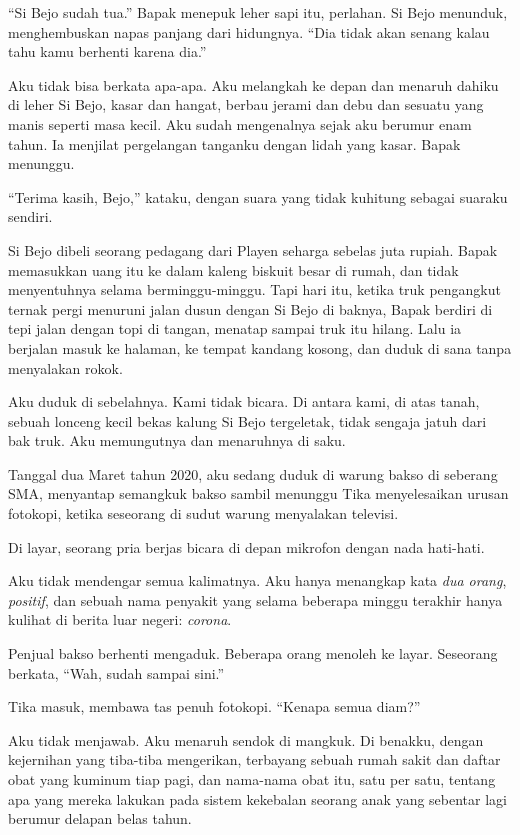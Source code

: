 \documentclass[11pt,twoside,openany]{book}
\makeatletter
\newcommand{\scenebreak}{\par\vspace{0.9em}{\centering\textsc{*\hspace{0.7em}*\hspace{0.7em}*}\par}\vspace{0.9em}\@afterindentfalse\@afterheading}
\makeatother
\begin{document}
``Si Bejo sudah tua.'' Bapak menepuk leher sapi itu, perlahan. Si Bejo menunduk, menghembuskan napas panjang dari hidungnya. ``Dia tidak akan senang kalau tahu kamu berhenti karena dia.''

Aku tidak bisa berkata apa-apa. Aku melangkah ke depan dan menaruh dahiku di leher Si Bejo, kasar dan hangat, berbau jerami dan debu dan sesuatu yang manis seperti masa kecil. Aku sudah mengenalnya sejak aku berumur enam tahun. Ia menjilat pergelangan tanganku dengan lidah yang kasar. Bapak menunggu.

``Terima kasih, Bejo,'' kataku, dengan suara yang tidak kuhitung sebagai suaraku sendiri.

Si Bejo dibeli seorang pedagang dari Playen seharga sebelas juta rupiah. Bapak memasukkan uang itu ke dalam kaleng biskuit besar di rumah, dan tidak menyentuhnya selama berminggu-minggu. Tapi hari itu, ketika truk pengangkut ternak pergi menuruni jalan dusun dengan Si Bejo di baknya, Bapak berdiri di tepi jalan dengan topi di tangan, menatap sampai truk itu hilang. Lalu ia berjalan masuk ke halaman, ke tempat kandang kosong, dan duduk di sana tanpa menyalakan rokok.

Aku duduk di sebelahnya. Kami tidak bicara. Di antara kami, di atas tanah, sebuah lonceng kecil bekas kalung Si Bejo tergeletak, tidak sengaja jatuh dari bak truk. Aku memungutnya dan menaruhnya di saku.

\scenebreak
Tanggal dua Maret tahun 2020, aku sedang duduk di warung bakso di seberang SMA, menyantap semangkuk bakso sambil menunggu Tika menyelesaikan urusan fotokopi, ketika seseorang di sudut warung menyalakan televisi.

Di layar, seorang pria berjas bicara di depan mikrofon dengan nada hati-hati.

Aku tidak mendengar semua kalimatnya. Aku hanya menangkap kata \emph{dua orang}, \emph{positif}, dan sebuah nama penyakit yang selama beberapa minggu terakhir hanya kulihat di berita luar negeri: \emph{corona}.

Penjual bakso berhenti mengaduk. Beberapa orang menoleh ke layar. Seseorang berkata, ``Wah, sudah sampai sini.''

Tika masuk, membawa tas penuh fotokopi. ``Kenapa semua diam?''

Aku tidak menjawab. Aku menaruh sendok di mangkuk. Di benakku, dengan kejernihan yang tiba-tiba mengerikan, terbayang sebuah rumah sakit dan daftar obat yang kuminum tiap pagi, dan nama-nama obat itu, satu per satu, tentang apa yang mereka lakukan pada sistem kekebalan seorang anak yang sebentar lagi berumur delapan belas tahun.
\end{document}
